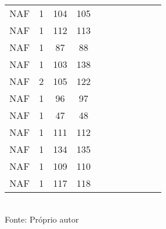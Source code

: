 \begin{table}[H]
{\begin{tabular}{ccccccccccc}
NAF & 1 & 104 & 105 &  &  &  &  &  &  &  \\
NAF & 1 & 112 & 113 &  &  &  &  &  &  &  \\
NAF & 1 & 87 & 88 &  &  &  &  &  &  &  \\
NAF & 1 & 103 & 138 &  &  &  &  &  &  &  \\
NAF & 2 & 105 & 122 &  &  &  &  &  &  &  \\
NAF & 1 & 96 & 97 &  &  &  &  &  &  &  \\
NAF & 1 & 47 & 48 &  &  &  &  &  &  &  \\
NAF & 1 & 111 & 112 &  &  &  &  &  &  &  \\
NAF & 1 & 134 & 135 &  &  &  &  &  &  &  \\
NAF & 1 & 109 & 110 &  &  &  &  &  &  &  \\
NAF & 1 & 117 & 118 &  &  &  &  &  &  &  \\
\bottomrule
\end{tabular}}
\\Fonte: Próprio autor
\end{table}


